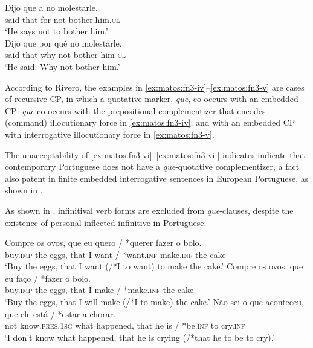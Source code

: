 \documentclass[output=paper,colorlinks,citecolor=brown,
]{langscibook}
\begin{document}
{\ea
\settowidth{}
  \ea\label{ex:matos:fn3-iv}
    \gll Dijo que a no molestarle. \\
                    said that for not bother.him.\textsc{cl}\\
    \glt ‘He says not to bother him.’\\ \citep[551]{rivero_indirect_1994}
  \ex\label{ex:matos:fn3-v}
    \gll Dijo que por qué no molestarle. \\
                said that why not bother him-\textsc{cl}\\
    \glt ‘He said: Why not bother him.’\\\citep[551]{rivero_indirect_1994}
  \z 
\z 

According to Rivero, the examples in \ref{ex:matos:fn3-iv}--\ref{ex:matos:fn3-v} are cases of recursive CP, in which a quotative marker, \textit{que}, co-occurs with an embedded CP: \textit{que} co-occurs with the prepositional complementizer that encodes (command) illocutionary force in \ref{ex:matos:fn3-iv}; and with an embedded CP with interrogative illocutionary force in \ref{ex:matos:fn3-v}. 

The unacceptability of \ref{ex:matos:fn3-vi}--\ref{ex:matos:fn3-vii} indicates indicate that contemporary Portuguese does not have a \textit{que}-quotative complementizer, a fact also patent in finite embedded interrogative sentences in European Portuguese, as shown in \citet[90]{matos_alternation_2013}.} %
As shown in , infinitival verb forms are excluded from \textit{que}-clauses, despite the existence of personal inflected infinitive in Portuguese: 

\ea \label{ex:matos:inf-ovos}
 \ea \label{ex:matos:inf-ovos-a}
 \gll Compre os ovos, que eu quero / *querer fazer o bolo.\\
 	  buy.\textsc{imp} the eggs, that I want / *want.\textsc{inf} make.\textsc{inf} the cake\\
 \glt ‘Buy the eggs, that I want (/*I to want) to make the cake.’
 \ex \label{ex:matos:inf-ovos-b}
 \gll Compre os ovos, que eu faço / *fazer o bolo.\\
	buy.\textsc{imp} the eggs, that I make / *make.\textsc{inf} the cake\\ 
 \glt ‘Buy the eggs, that I will make (/*I to make) the cake.’
 \ex \label{ex:matos:nao-sei-aconteceu}
 \gll Não sei {o que} aconteceu, que ele está / *estar a chorar.\\
	  not know.\textsc{pres}.\textsc{1sg} what happened, that he is / *be.\textsc{inf} to cry.\textsc{inf}\\
 \glt ‘I don’t know what happened, that he is crying (/*that he to be       to cry).’ 
 \z
 \z 
\end{document}
